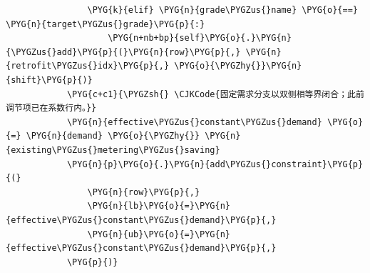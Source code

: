 \begin{Verbatim}
                \PYG{k}{elif} \PYG{n}{grade\PYGZus{}name} \PYG{o}{==} \PYG{n}{target\PYGZus{}grade}\PYG{p}{:}
                    \PYG{n+nb+bp}{self}\PYG{o}{.}\PYG{n}{\PYGZus{}add}\PYG{p}{(}\PYG{n}{row}\PYG{p}{,} \PYG{n}{retrofit\PYGZus{}idx}\PYG{p}{,} \PYG{o}{\PYGZhy{}}\PYG{n}{shift}\PYG{p}{)}
            \PYG{c+c1}{\PYGZsh{} \CJKCode{固定需求分支以双侧相等界闭合；此前调节项已在系数行内。}}
            \PYG{n}{effective\PYGZus{}constant\PYGZus{}demand} \PYG{o}{=} \PYG{n}{demand} \PYG{o}{\PYGZhy{}} \PYG{n}{existing\PYGZus{}metering\PYGZus{}saving}
            \PYG{n}{p}\PYG{o}{.}\PYG{n}{add\PYGZus{}constraint}\PYG{p}{(}
                \PYG{n}{row}\PYG{p}{,}
                \PYG{n}{lb}\PYG{o}{=}\PYG{n}{effective\PYGZus{}constant\PYGZus{}demand}\PYG{p}{,}
                \PYG{n}{ub}\PYG{o}{=}\PYG{n}{effective\PYGZus{}constant\PYGZus{}demand}\PYG{p}{,}
            \PYG{p}{)}
\end{Verbatim}
